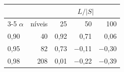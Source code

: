\begin{tabular}{lrrrr}
\toprule
& & \multicolumn{3}{c}{$L/|S|$} \\ \cmidrule(l){3-5}
$\alpha$ & níveis & 25 & 50 & 100 \\ \midrule
0{,}90 & 40 & 0{,}92 & 0{,}71 & 0{,}06 \\
0{,}95 & 82 & 0{,}73 & $-$0{,}11 & $-$0{,}30 \\
0{,}98 & 208 & 0{,}01 & $-$0{,}22 & $-$0{,}39 \\
\bottomrule
\end{tabular}

